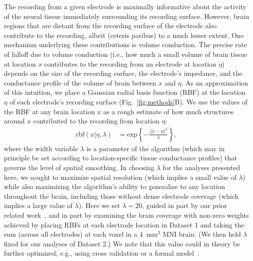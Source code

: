 \documentclass[11pt]{article}
\begin{document}
The recording from a given electrode is maximally informative about the activity
of the neural tissue immediately surrounding its recording surface.  However,
brain regions that are distant from the recording surface of the electrode also
contribute to the recording, albeit (ceteris paribus) to a much lesser extent.
One mechanism underlying these contributions is volume conduction.  The precise
rate of falloff due to volume conduction (i.e., how much a small volume of brain
tissue at location $x$ contributes to the recording from an electrode at
location $\eta$) depends on the size of the recording surface, the electrode's
impedance, and the conductance profile of the volume of brain between $x$ and
$\eta$.  As an approximation of this intuition, we place a Gaussian radial basis
function (RBF) at the location $\eta$ of each electrode's recording surface
(Fig.~\ref{fig:methods}B).  We use the values of the RBF at any brain location
$x$ as a rough estimate of how much structures around $x$ contributed to the
recording from location $\eta$: \begin{align} \mathrm{rbf}(x|\eta,\lambda) & =
\mathrm{exp}\left\{ -\frac{||x - \eta||^2}{\lambda} \right\},\label{eqn:rbf}
\end{align} where the width variable $\lambda$ is a parameter of the algorithm
(which may in principle be set according to location-specific tissue conductance
profiles) that governs the level of spatial smoothing.  In choosing $\lambda$
for the analyses presented here, we sought to maximize spatial resolution (which
implies a small value of $\lambda$) while also maximizing the algorithm's
ability to generalize to any location throughout the brain, including those
without dense electrode coverage (which implies a large value of $\lambda$).
Here we set $\lambda = 20$, guided in part by our prior related
work~\citep{MannEtal14b, MannEtal18}, and in part by examining the brain
coverage with non-zero weights achieved by placing RBFs at each electrode
location in Dataset 1 and taking the sum (across all electrodes) at each voxel
in a 4~mm$^3$ MNI brain.  (We then held $\lambda$ fixed for our analyses of
Dataset 2.)  We note that this value could in theory be further optimized, e.g.,
using cross validation or a formal model~\citep[e.g.,][]{MannEtal18}.
\end{document}
